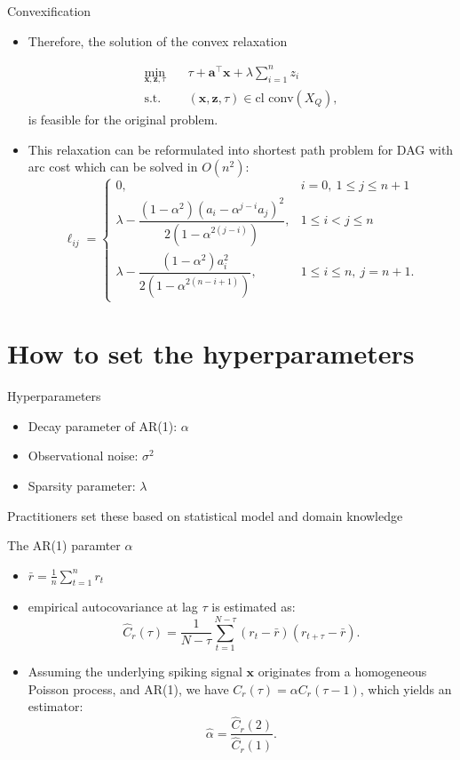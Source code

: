 \documentclass[15pt]{beamer}
\theoremstyle{definition}
\begin{document}
%
\begin{frame}{Convexification}
	\begin{itemize}
\item Therefore, the solution of the convex relaxation
 
\begin{align*}
	\min_{\mathbf{x}, \mathbf{z}, \tau} \quad & \tau + \mathbf{a}^\top \mathbf{x} + \lambda \sum_{i=1}^n z_i \\
	\text{s.t.} \quad 
	& (\mathbf{x}, \mathbf{z}, \tau) \in \text{cl conv}(X_Q),
\end{align*}
is feasible for the original problem. 
\item 
This relaxation can be reformulated into shortest path problem for DAG with arc cost which can be solved in $O(n^2)$:
$$
\ell_{ij} = 
\begin{cases} 
	0, & i = 0, \ 1 \le j \le n + 1 \\ 
	\lambda - \dfrac{(1 - \alpha^2) \left( a_i - \alpha^{j-i} a_j \right)^2}{2\left(1 - \alpha^{2(j-i)}\right)}, & 1 \le i < j \le n \\ 
	\lambda - \dfrac{(1 - \alpha^2)a_i^2}{2\left(1 - \alpha^{2(n-i+1)}\right)}, & 1 \le i \le n, \ j = n + 1.
\end{cases}
$$
 \end{itemize}
	\end{frame}
	
\section{How to set the hyperparameters} 

\begin{frame}{Hyperparameters}
\begin{itemize}
	\item Decay parameter of AR(1): $\alpha$
	\item Observational noise: $\sigma^2$
	\item Sparsity parameter: $\lambda$
\end{itemize}	
Practitioners set these  based on statistical model and domain knowledge
\end{frame}
	
	\begin{frame}{The AR(1) paramter $\alpha$}
\begin{itemize}
	\item  $\bar{r} = \frac{1}{n} \sum_{t=1}^n r_t$
	\item   empirical autocovariance at lag $\tau$ is estimated as:
	$$
	\hat{C}_r(\tau) = \frac{1}{N-\tau} \sum_{t=1}^{N-\tau} (r_t - \bar{r})(r_{t+\tau} - \bar{r}).
	$$
	\item Assuming the underlying spiking signal $\mathbf{x}$ originates from a homogeneous Poisson process, and AR(1), we have $C_r(\tau) = \alpha C_r(\tau - 1)$, which yields an estimator:
			$$
	\hat{\alpha} = \frac{\hat{C}_r(2)}{\hat{C}_r(1)}.
	$$
\end{itemize}
\end{frame}
\end{document}
